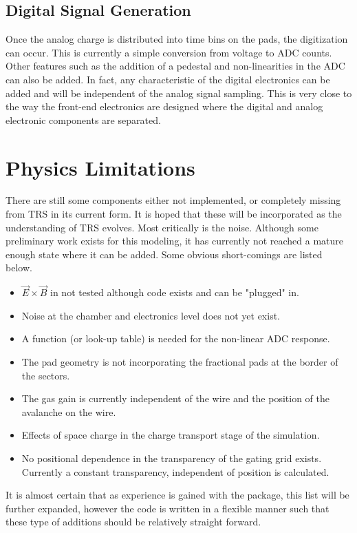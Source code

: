 \documentclass{article}
\begin{document}
\subsection{Digital Signal Generation}

Once the analog charge is distributed into time bins on the pads,
the digitization can occur.  This is currently a simple
conversion from voltage to ADC counts.  Other features
such as the addition of a pedestal
and non-linearities in the ADC can also be added.
In fact, any characteristic of the
digital electronics can be added and will be independent
of the analog signal sampling.  This is very close to
the way the front-end electronics are designed where the
digital and analog electronic components are separated.

\section{Physics Limitations}

There are still some components either not implemented,
or completely missing from TRS in its current form.  It
is hoped that these will be incorporated as the understanding
of TRS evolves.  Most critically is the noise.  Although some
preliminary work exists for this modeling, it has currently not
reached a mature enough state where it can be added.  Some obvious
short-comings are listed below.
\begin{itemize}
  \item $\vec{E} \times \vec{B}$ in not tested although code exists
    and can be "plugged" in.
  \item Noise at the chamber and electronics level does not yet exist.
  \item A function (or look-up table) is needed for the non-linear ADC
    response.
  \item The pad geometry is not incorporating the fractional pads at the
    border of the sectors.
  \item The gas gain is currently independent of the wire and the
    position of the avalanche on the wire.
  \item Effects of space charge in the charge transport stage of the
    simulation.
  \item No positional dependence in the transparency of the gating grid
    exists.  Currently a constant transparency, independent of position
    is calculated.
\end{itemize}

It is almost certain that as
experience is gained with the package, this list will be further
expanded, however the code is written in a flexible manner such that
these type of additions should be relatively straight forward.
\end{document}
